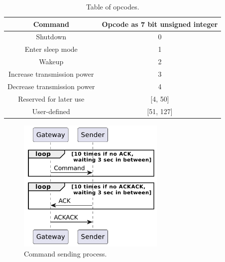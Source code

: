 \begin{table}[ht]
    \caption{Table of opcodes.}
    \label{tab: opcodes}
    \centering
    \begin{tabular}{ |c|c| }
        \hline
        \textbf{Command} & \textbf{Opcode as 7 bit unsigned integer}\\
        \hline
        Shutdown & 0\\
        \hline
        Enter sleep mode & 1\\
        \hline
        Wakeup & 2\\
        \hline
        Increase transmission power & 3\\
        \hline
        Decrease transmission power & 4\\
        \hline
        Reserved for later use & [4, 50]\\
        \hline
        User-defined & [51, 127]\\
        \hline
    \end{tabular}
\end{table}

\begin{figure}[ht]
    \centering
    \includegraphics[width=200pt]{uml/command_ack.pdf}
    \caption{Command sending process.}
    \label{img: command ack}
\end{figure}


